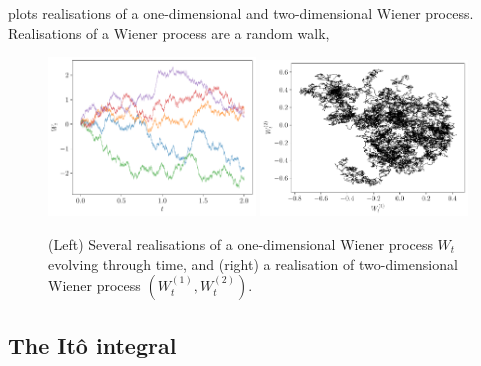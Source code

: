 
 plots realisations of a one-dimensional and two-dimensional Wiener process.
Realisations of a Wiener process are a random walk,

\begin{figure}
	\begin{center}
		\includegraphics[width=0.49\textwidth]{figures/wiener_realisations_1d.pdf}
		\includegraphics[width=0.49\textwidth]{figures/wiener_realisations_2d.pdf}
		\caption{(Left) Several realisations of a one-dimensional Wiener process \(W_t\) evolving through time, and (right) a realisation of two-dimensional Wiener process \(\left(W_t^{(1)}, W_t^{(2)}\right)\).}
		\label{fig:wiener_rels}
	\end{center}
\end{figure}


\subsection{The It\^o integral}\label{sec:bkg_ito}

